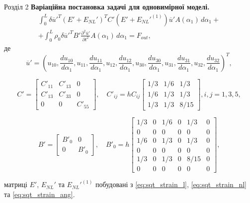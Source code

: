 \documentclass[8pt]{beamer}
\numberwithin{figure}{section}
\numberwithin{equation}{section}
\numberwithin{table}{section}
\begin{document}
\begin{frame}{Розділ 2}
\textbf{Варіаційна постановка задачі для одновимірної моделі.}
\\
\vspace{1em}
\begin{multline}
\int_0^L \delta\overline{u}'^T \left( E' + E_{NL}' \right)^T C' \left( E' + E_{NL}'^{(1)} \right)\overline{u}' A\left(\alpha_1\right)\, d\alpha_1+\\+\int_0^L \rho_0 \delta\overline{u}'^T B'\frac{\partial^2 \overline{u}'}{\partial t^2} A\left(\alpha_1\right)\, d\alpha_1=F_{out},
\end{multline}
де
\[
\overline{u}' = \left( u_{10},
\frac { du_{10}} { d \alpha_1},
u_{11},
\frac { du_{11}} { d \alpha_1},
u_{12},
\frac { du_{12}} { d \alpha_1},
u_{30},
\frac { du_{30}} { d \alpha_1},
u_{31},
\frac { du_{31}} { d \alpha_1},
u_{32},
\frac { du_{32}} { d \alpha_1}
\right)^T,
\]


\[
C'=\left[
\begin{array}{ccc}
C'_{11} & C'_{13} & 0 \\ 
C'_{13} & C'_{33} & 0 \\ 
0 & 0 & C'_{55}
\end{array} 
\right], \quad 
C'_{ij}=hC_{ij}\left[
\begin{array}{ccc}
1/3 & 1/6 & 1/3 \\ 
1/6 & 1/3 & 1/3 \\ 
1/3 & 1/3 & 8/15
\end{array} 
\right], i,j=1,3,5,
\]

\[
B'=\left[
\begin{array}{cc}
B'_0 & 0 \\ 
0 & B'_0
\end{array} 
\right], \quad 
B'_0=h\left[
\begin{array}{cccccc}
1/3 & 0 & 1/6 & 0 & 1/3 & 0 \\ 
0 & 0 & 0 & 0 & 0 & 0 \\ 
1/6 & 0 & 1/3 & 0 & 1/3 & 0 \\ 
0 & 0 & 0 & 0 & 0 & 0 \\ 
1/3 & 0 & 1/3 & 0 & 8/15 & 0\\
0 & 0 & 0 & 0 & 0 & 0 
\end{array} 
\right],
\]

матриці $E'$, $E_{NL}'$ та $E_{NL}'^{(1)}$ побудовані з \eqref{eq:sqt_strain_l}, \eqref{eq:sqt_strain_nl} та \eqref{eq:sqt_strain_ang}.

\end{frame}
\end{document}
